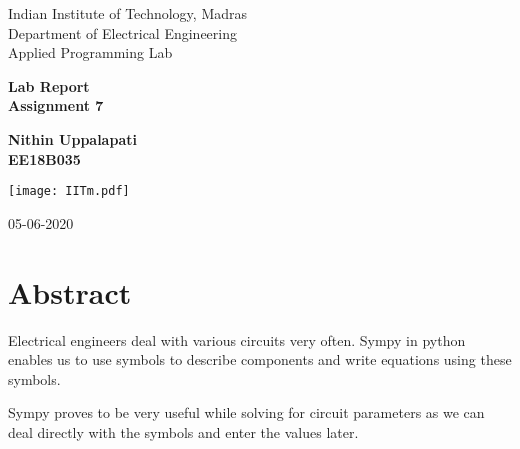 \documentclass[10pt,english, openany]{book}
\begin{document}

\begin{titlepage}
	\clearpage\thispagestyle{empty}
	\centering
	\vspace{1cm}

	{\Large Indian Institute of Technology, Madras \\ 
		Department of Electrical Engineering \\
		Applied Programming Lab \par}
		\vspace{3cm}
	{\LARGE \textbf{Lab Report}} \\
    \LARGE \textbf{Assignment 7} \\
	\vspace{3cm}
	{\large \textbf{Nithin Uppalapati} \\ 
     \large \textbf{EE18B035} \\%
	\vspace{2cm}
    
    \centering \texttt{[image: IITm.pdf]}
%     
    \vspace{1.5cm}
		
	{\normalsize 05-06-2020 \par}
	
	\pagebreak
}
\end{titlepage}

\tableofcontents{}

\mainmatter

\chapter{Abstract}
	Electrical engineers deal with various circuits very often. Sympy in python enables us to use symbols to describe components and write equations using these symbols. \par
    Sympy proves to be very useful while solving for circuit parameters as we can deal directly with the symbols and enter the values later.
\begingroup
\end{document}
